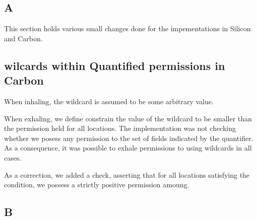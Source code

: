 \documentclass[12pt]{article}
\begin{document}
\subsection{A}
This section holds various small changes done for the impementations in Silicon and Carbon.

\subsection{wilcards within Quantified permissions in Carbon}
When inhaling, the wildcard is assumed to be some arbitrary value. 

When exhaling, we define constrain the value of the wildcard to be smaller than the permission held for all locations. The implementation was not checking whether we posess any permission to the set of fields indicated by the quantifier. As a consequence, it was possible to exhale permissions to using wildcards in all cases.

As a correction, we added a check, asserting that for all locations satisfying the condition, we possess a strictly positive permission amoung.

\subsection{B}

\end{document}
